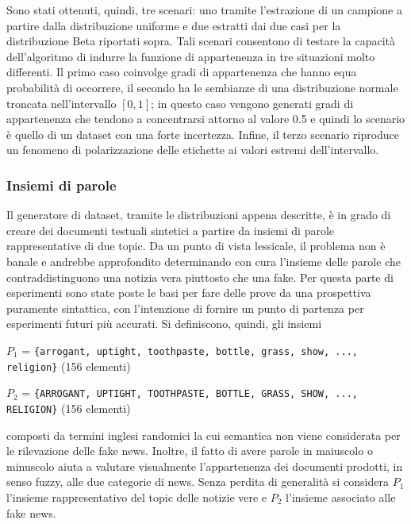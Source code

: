 \documentclass[12pt]{report}
\theoremstyle{definition}
\begin{document}
Sono stati ottenuti, quindi, tre scenari: uno tramite l'estrazione di un campione a partire dalla distribuzione uniforme e due estratti dai due casi per la distribuzione Beta riportati sopra. Tali scenari consentono di testare la capacità dell'algoritmo di indurre la funzione di appartenenza in tre situazioni molto differenti. 
Il primo caso coinvolge gradi di appartenenza che hanno equa probabilità di occorrere, il secondo ha le sembianze di una distribuzione normale troncata nell'intervallo $[0,1]$; in questo caso vengono generati gradi di appartenenza che tendono a concentrarsi attorno al valore 0.5 e quindi lo scenario è quello di un dataset con una forte incertezza. Infine, il terzo scenario riproduce un fenomeno di polarizzazione delle etichette ai valori estremi dell'intervallo.

\subsubsection{Insiemi di parole} Il generatore di dataset, tramite le distribuzioni appena descritte, è in grado di creare dei documenti testuali sintetici a partire da insiemi di parole rappresentative di due topic.
Da un punto di vista lessicale, il problema non è banale e andrebbe approfondito determinando con cura l'insieme delle parole che contraddistinguono una notizia vera piuttosto che una fake.
Per questa parte di esperimenti sono state poste le basi per fare delle prove da una prospettiva puramente sintattica, con l'intenzione di fornire un punto di partenza per esperimenti futuri più accurati. Si definiscono, quindi, gli insiemi
\begin{center}
    $P_1$ = \texttt{\{arrogant, uptight, toothpaste, bottle, grass, show, ..., religion\}} (156 elementi)
\end{center}
\begin{center}
    $P_2$ = \texttt{\{ARROGANT, UPTIGHT, TOOTHPASTE, BOTTLE, GRASS, SHOW, ..., RELIGION\}} (156 elementi)
\end{center}
composti da termini inglesi randomici la cui semantica non viene considerata per le rilevazione delle fake news. Inoltre, il fatto di avere parole in maiuscolo o minuscolo aiuta a valutare visualmente l'appartenenza dei documenti prodotti, in senso fuzzy, alle due categorie di news. Senza perdita di generalità si considera $P_1$ l'insieme rappresentativo del topic delle notizie vere e $P_2$ l'insieme associato alle fake news.
\end{document}
